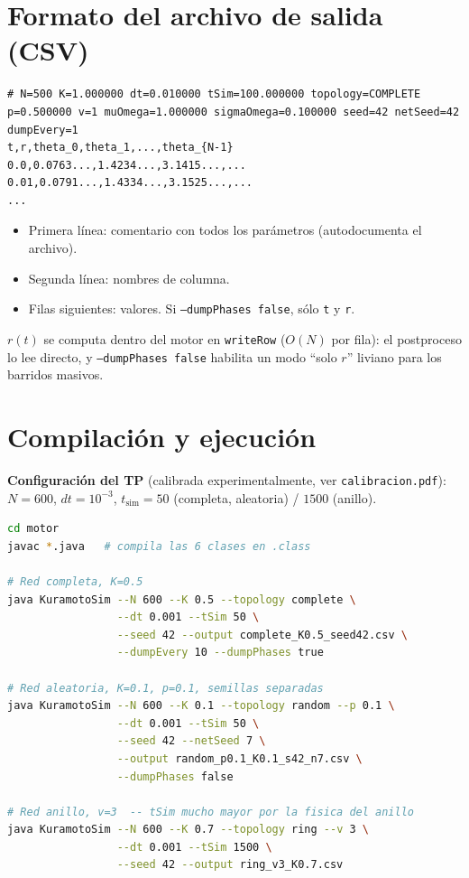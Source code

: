 \documentclass[11pt,a4paper]{article}
\begin{document}
\section{Formato del archivo de salida (CSV)}

\begin{lstlisting}
# N=500 K=1.000000 dt=0.010000 tSim=100.000000 topology=COMPLETE p=0.500000 v=1 muOmega=1.000000 sigmaOmega=0.100000 seed=42 netSeed=42 dumpEvery=1
t,r,theta_0,theta_1,...,theta_{N-1}
0.0,0.0763...,1.4234...,3.1415...,...
0.01,0.0791...,1.4334...,3.1525...,...
...
\end{lstlisting}

\begin{itemize}
\item Primera línea: comentario con todos los parámetros (autodocumenta el archivo).
\item Segunda línea: nombres de columna.
\item Filas siguientes: valores. Si \texttt{--dumpPhases false}, sólo \texttt{t} y \texttt{r}.
\end{itemize}

$r(t)$ se computa dentro del motor en \texttt{writeRow} ($O(N)$ por fila): el postproceso lo lee directo, y \texttt{--dumpPhases false} habilita un modo ``solo $r$'' liviano para los barridos masivos.

\section{Compilación y ejecución}

\textbf{Configuración del TP} (calibrada experimentalmente, ver \texttt{calibracion.pdf}):
$N=600$, $dt=10^{-3}$, $t_{\text{sim}}=50$ (completa, aleatoria) / $1500$ (anillo).

\begin{lstlisting}[language=bash]
cd motor
javac *.java   # compila las 6 clases en .class

# Red completa, K=0.5
java KuramotoSim --N 600 --K 0.5 --topology complete \
                 --dt 0.001 --tSim 50 \
                 --seed 42 --output complete_K0.5_seed42.csv \
                 --dumpEvery 10 --dumpPhases true

# Red aleatoria, K=0.1, p=0.1, semillas separadas
java KuramotoSim --N 600 --K 0.1 --topology random --p 0.1 \
                 --dt 0.001 --tSim 50 \
                 --seed 42 --netSeed 7 \
                 --output random_p0.1_K0.1_s42_n7.csv \
                 --dumpPhases false

# Red anillo, v=3  -- tSim mucho mayor por la fisica del anillo
java KuramotoSim --N 600 --K 0.7 --topology ring --v 3 \
                 --dt 0.001 --tSim 1500 \
                 --seed 42 --output ring_v3_K0.7.csv
\end{lstlisting}
\end{document}
